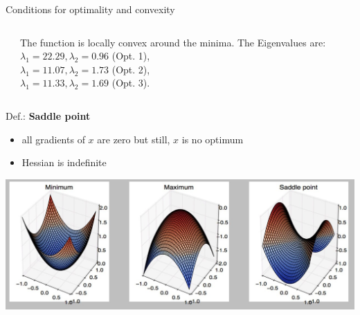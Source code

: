 \documentclass[11pt,compress,t,notes=noshow, xcolor=table]{beamer}
\begin{document}
\begin{vbframe}{Conditions for optimality and convexity}
\begin{columns}
\begin{column}{0.55\textwidth}
\end{column}
\hspace*{-4cm}
\begin{column}{0.3\textwidth}
\begin{tiny}
The function is locally convex around the minima. The Eigenvalues are: $\lambda_1 = 22.29, \lambda_2 = 0.96$ (Opt. 1),\\ $\lambda_1 = 11.07, \lambda_2 = 1.73$ (Opt. 2),\\ $\lambda_1 = 11.33, \lambda_2 = 1.69$ (Opt. 3). 
\end{tiny}\end{column}
\end{columns}


\framebreak 

Def.: \textbf{Saddle point}
\begin{itemize}
    \item all gradients of $x$ are zero but still, $x$ is no optimum
    \item Hessian is indefinite
\end{itemize}

\begin{center}
\includegraphics[scale= 0.5]{figure_man/convex.jpg}
\end{center}




\end{vbframe}


  \endlecture
  
\end{document}
